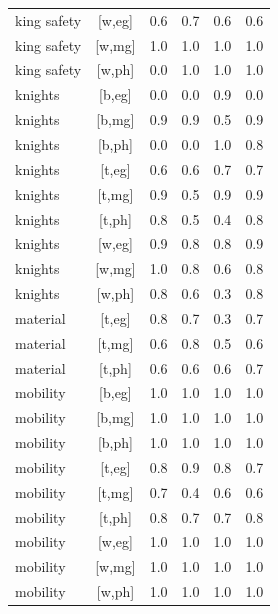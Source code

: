 \documentclass{article}
\begin{document}
\begin{longtable}{lcrrrr}
  king safety & [w,eg] &      0.6 &      0.7 &      0.6 &      0.6 \\
  king safety & [w,mg] &      1.0 &      1.0 &      1.0 &      1.0 \\
  king safety & [w,ph] &      0.0 &      1.0 &      1.0 &      1.0 \\
      knights & [b,eg] &      0.0 &      0.0 &      0.9 &      0.0 \\
      knights & [b,mg] &      0.9 &      0.9 &      0.5 &      0.9 \\
      knights & [b,ph] &      0.0 &      0.0 &      1.0 &      0.8 \\
      knights & [t,eg] &      0.6 &      0.6 &      0.7 &      0.7 \\
      knights & [t,mg] &      0.9 &      0.5 &      0.9 &      0.9 \\
      knights & [t,ph] &      0.8 &      0.5 &      0.4 &      0.8 \\
      knights & [w,eg] &      0.9 &      0.8 &      0.8 &      0.9 \\
      knights & [w,mg] &      1.0 &      0.8 &      0.6 &      0.8 \\
      knights & [w,ph] &      0.8 &      0.6 &      0.3 &      0.8 \\
     material & [t,eg] &      0.8 &      0.7 &      0.3 &      0.7 \\
     material & [t,mg] &      0.6 &      0.8 &      0.5 &      0.6 \\
     material & [t,ph] &      0.6 &      0.6 &      0.6 &      0.7 \\
     mobility & [b,eg] &      1.0 &      1.0 &      1.0 &      1.0 \\
     mobility & [b,mg] &      1.0 &      1.0 &      1.0 &      1.0 \\
     mobility & [b,ph] &      1.0 &      1.0 &      1.0 &      1.0 \\
     mobility & [t,eg] &      0.8 &      0.9 &      0.8 &      0.7 \\
     mobility & [t,mg] &      0.7 &      0.4 &      0.6 &      0.6 \\
     mobility & [t,ph] &      0.8 &      0.7 &      0.7 &      0.8 \\
     mobility & [w,eg] &      1.0 &      1.0 &      1.0 &      1.0 \\
     mobility & [w,mg] &      1.0 &      1.0 &      1.0 &      1.0 \\
     mobility & [w,ph] &      1.0 &      1.0 &      1.0 &      1.0 \\

\end{longtable}
\end{document}
